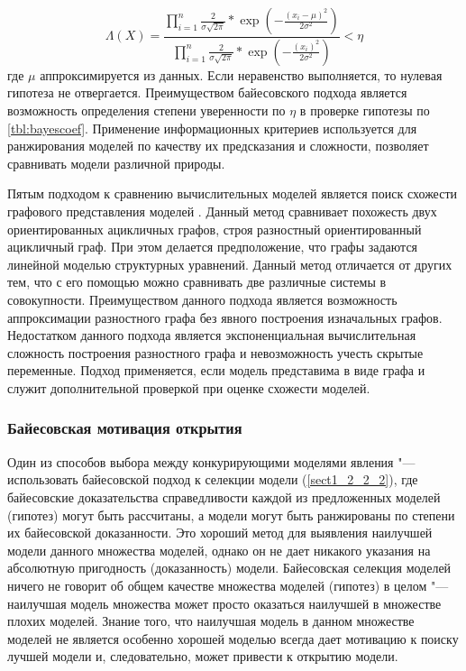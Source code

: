 \begin{equation}
\Lambda(X) = \frac{\prod_{i=1}^n \frac{2}{\sigma\sqrt{2\pi}} * \exp{\left(-\frac{\left(x_i - \mu\right)^2 }
    {2\sigma^2}\right)}}{\prod_{i=1}^n \frac{2}{\sigma\sqrt{2\pi}} * \exp{\left(-\frac{\left(x_i \right)^2 }
    {2\sigma^2}\right)}} < \eta
\end{equation}
где $\mu$ аппроксимируется из данных. Если неравенство  выполняется, то нулевая гипотеза не отвергается. Преимуществом 
байесовского подхода является возможность определения степени уверенности по $ \eta $ в проверке гипотезы по 
\cref{tbl:bayescoef}. Применение информационных критериев используется для ранжирования моделей по качеству их 
предсказания и сложности, позволяет сравнивать модели различной природы.

Пятым подходом к сравнению вычислительных моделей является поиск схожести графового представления моделей 
\cite{wang2018direct}. Данный метод сравнивает похожесть двух ориентированных ацикличных графов, строя разностный 
ориентированный ацикличный граф. При этом делается предположение, что графы задаются линейной моделью структурных 
уравнений. Данный метод отличается от других тем, что с его помощью можно сравнивать две различные системы в 
совокупности. Преимуществом данного подхода является возможность аппроксимации разностного графа без явного построения 
изначальных графов.  Недостатком данного подхода является экспоненциальная вычислительная сложность построения 
разностного графа и невозможность учесть скрытые переменные. Подход применяется, если модель представима в виде графа 
и служит дополнительной проверкой при оценке схожести моделей.

\subsubsection{Байесовская мотивация открытия}\label{sect1_2_3_2}
Один из способов выбора между конкурирующими моделями явления "--- использовать байесовской подход к селекции модели 
(\cref{sect1_2_2_2}), где байесовские доказательства справедливости каждой из предложенных моделей (гипотез) могут быть 
рассчитаны, а модели могут быть ранжированы по степени их байесовской доказанности. Это хороший метод для выявления 
наилучшей модели данного множества моделей, однако он не дает никакого указания на абсолютную пригодность 
(доказанность) модели. Байесовская селекция моделей ничего не говорит об общем качестве множества моделей (гипотез) 
в целом "--- наилучшая модель множества может просто оказаться наилучшей в множестве плохих моделей. Знание того, что 
наилучшая модель в данном множестве моделей не является особенно хорошей моделью всегда дает мотивацию к поиску лучшей 
модели и, следовательно, может привести к открытию модели.


